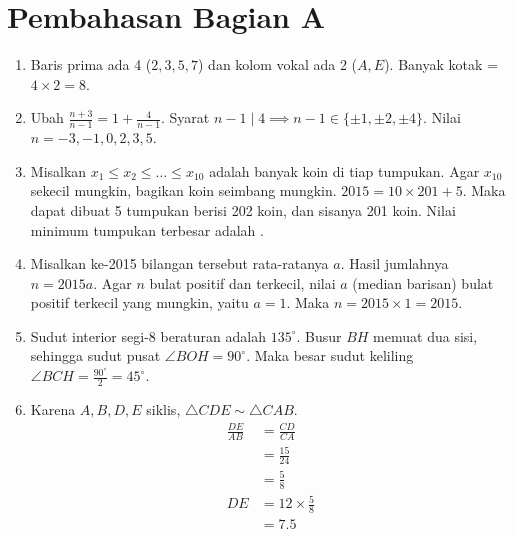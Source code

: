 \documentclass[11pt]{article}
\begin{document}
\newpage
\section*{Pembahasan Bagian A}
\begin{enumerate}
    \item Baris prima ada 4 ($2, 3, 5, 7$) dan kolom vokal ada 2 ($A, E$). Banyak kotak = $4 \times 2 = \boxed{\boxed{8}}$.
    \item Ubah $\frac{n+3}{n-1} = 1 + \frac{4}{n-1}$. Syarat $n-1 \mid 4 \implies n-1 \in \{\pm1, \pm2, \pm4\}$. Nilai $n = \boxed{\boxed{-3, -1, 0, 2, 3, 5}}$.
    \item Misalkan $x_1 \le x_2 \le \dots \le x_{10}$ adalah banyak koin di tiap tumpukan. Agar $x_{10}$ sekecil mungkin, bagikan koin seimbang mungkin. $2015 = 10 \times 201 + 5$. Maka dapat dibuat 5 tumpukan berisi 202 koin, dan sisanya 201 koin. Nilai minimum tumpukan terbesar adalah .
    \item Misalkan ke-2015 bilangan tersebut rata-ratanya $a$. Hasil jumlahnya $n = 2015a$. Agar $n$ bulat positif dan terkecil, nilai $a$ (median barisan) bulat positif terkecil yang mungkin, yaitu $a=1$. Maka $n = 2015 \times 1 = \boxed{\boxed{2015}}$.
    \item Sudut interior segi-8 beraturan adalah $135^\circ$. Busur $BH$ memuat dua sisi, sehingga sudut pusat $\angle BOH = 90^\circ$. Maka besar sudut keliling $\angle BCH = \frac{90^\circ}2 = \boxed{\boxed{45^\circ}}$.
    
    \begin{center}
    \end{center}
    \item Karena $A,B,D,E$ siklis, $\triangle CDE \sim \triangle CAB$.  \begin{align*}\frac{DE}{AB} &= \frac{CD}{CA}\\[4pt] &= \frac{15}{24} \\[4pt]&= \frac58 \\ DE &= 12 \times \frac58 \\&= \boxed{\boxed{7.5}}\end{align*}
    

\end{enumerate}
\end{document}
